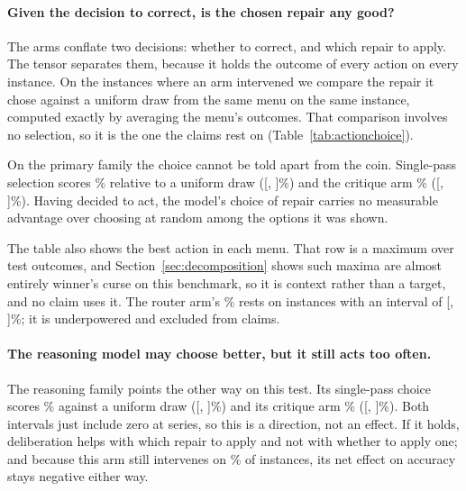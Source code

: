 \paragraph{Given the decision to correct, is the chosen repair any good?}
The arms conflate two decisions: whether to correct, and which repair to apply. The
tensor separates them, because it holds the outcome of every action on every instance.
On the instances where an arm intervened we compare the repair it chose against a
uniform draw from the same menu on the same instance, computed exactly by averaging the
menu's outcomes. That comparison involves no selection, so it is the one the claims rest
on (Table~\ref{tab:actionchoice}).

On the primary family the choice cannot be told apart from the coin. Single-pass
selection scores \actionChoiceSinglePct\% relative to a uniform draw
([\actionChoiceSingleCIlo, \actionChoiceSingleCIhi]\%) and the critique arm
\actionChoiceCritiquePct\% ([\actionChoiceCritiqueCIlo, \actionChoiceCritiqueCIhi]\%).
Having decided to act, the model's choice of repair carries no measurable advantage over
choosing at random among the options it was shown.

The table also shows the best action in each menu. That row is a maximum over test
outcomes, and Section~\ref{sec:decomposition} shows such maxima are almost entirely
winner's curse on this benchmark, so it is context rather than a target, and no claim
uses it. The router arm's \actionChoiceRouterPct\% rests on \actionChoiceRouterN{}
instances with an interval of [\actionChoiceRouterCIlo, \actionChoiceRouterCIhi]\%; it
is underpowered and excluded from claims.

\begin{table}[htbp]
\centering
\caption{Given the decision to correct, how good is the chosen repair? MASE on the
instances where each arm intervened. The uniform draw averages the menu's outcomes
exactly and is the comparison claims rest on. The best-in-menu row is a maximum over
test outcomes, inflated by selection (Section~\ref{sec:decomposition}), and is shown
for context only. Intervals are series-level bootstrap; the router arm is underpowered.}
\label{tab:actionchoice}
\small
\fittable{}
\end{table}

\paragraph{The reasoning model may choose better, but it still acts too often.}
The reasoning family points the other way on this test. Its single-pass choice scores
\reasonChoiceSinglePct\% against a uniform draw ([\reasonChoiceSingleCIlo,
\reasonChoiceSingleCIhi]\%) and its critique arm \reasonChoiceCritiquePct\%
([\reasonChoiceCritiqueCIlo, \reasonChoiceCritiqueCIhi]\%). Both intervals just
include zero at \reasonSeries{} series, so this is a direction, not an effect. If it
holds, deliberation helps with which repair to apply and not with whether to apply one;
and because this arm still intervenes on \reasonRateSingle\% of instances, its net
effect on accuracy stays negative either way.


